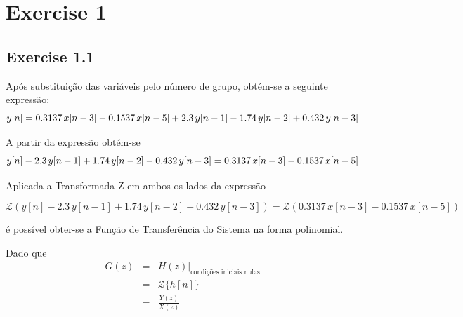 \documentclass[a4paper]{article}
\title{\documentTitle}
\author{\documentAuthors}
\begin{document}
\maketitle
\cleardoublepage

\tableofcontents
\cleardoublepage

\setlength{\parindent}{1cm}
\setlength{\parskip}{0.3cm}

\section{Exercise 1}
\subsection{Exercise 1.1}
\noindent Após substituição das variáveis pelo número de grupo, obtém-se a seguinte expressão:
\begin{equation}
	y[n] = 0.3137 \, x[n - 3] - 0.1537 \, x[n - 5] + 2.3 \, y[n - 1] - 1.74 \, y[n - 2] + 0.432 \, y[n - 3] \\
\end{equation}

\noindent A partir da expressão obtém-se
\begin{equation}
	y[n] - 2.3 \, y[n - 1] + 1.74 \, y[n - 2] - 0.432 \, y[n - 3] = 0.3137 \, x[n - 3] - 0.1537 \, x[n - 5] \\
\end{equation}

\noindent Aplicada a Transformada Z em ambos os lados da expressão

\begin{equation}
	\mathcal{Z}(y[n] - 2.3 \, y[n - 1] + 1.74 \, y[n - 2] - 0.432 \, y[n - 3]) = \mathcal{Z}(0.3137 \, x[n - 3] - 0.1537 \, x[n - 5])
\end{equation}

\noindent é possível obter-se a Função de Transferência do Sistema na forma polinomial.

\noindent Dado que
\begin{eqnarray}
	G(z) & = & H(z)|_{\text{condições iniciais nulas}} \\
		 & = & \mathcal{Z}\{h[n]\} \\
		 & = & \frac{Y(z)}{X(z)}
\end{eqnarray}
\end{document}
